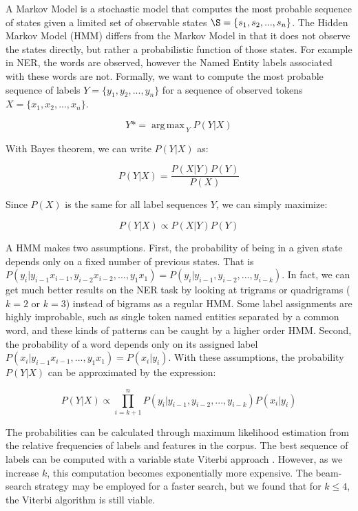 \documentclass[sigconf]{acmart}
\DeclareMathOperator*{\argmax}{arg\,max\,}
\begin{document}
A Markov Model is a stochastic model that computes the most probable sequence of states 
given a limited set of observable states $ \S = \{s_1, s_2, ..., s_n \} $.
The Hidden Markov Model (HMM) differs from the Markov Model in that it
does not observe the states directly, but rather a probabilistic function of those 
states. For example in NER, the words are observed, however the Named Entity labels
associated with these words are not. Formally, we want to compute the most probable
sequence of labels $ Y = \{y_1, y_2, ..., y_n\} $ for a sequence of observed tokens
$ X = \{x_1, x_2, ..., x_n\} $.

\begin{equation}
Y* = \argmax_{Y} P(Y|X)
\end{equation}

With Bayes theorem, we can write $ P(Y|X) $ as:

\begin{equation}
P(Y|X) = \frac{P(X|Y) P(Y)}{P(X)}
\end{equation}

Since $ P(X) $ is the same for all label sequences $ Y $, we can simply maximize:

\begin{equation}
P(Y|X) \propto P(X|Y) P(Y)
\end{equation}

A HMM makes two assumptions. First, the probability of being in a given state depends 
only on a fixed number of previous states. That is 
$ P(y_i|y_{i-1}x_{i-1}, y_{i-2}x_{i-2}, ..., y_1x_1) = P(y_i|y_{i-1}, y_{i-2},..., y_{i-k}) $. 
In fact, we can get much better results on the NER task by looking at trigrams
or quadrigrams ($ k = 2 $ or $ k = 3 $) instead of bigrams as a regular HMM. 
Some label assignments are highly improbable, such as single token named entities 
separated by a common word, and these kinds of patterns can be caught by a higher order HMM.
Second, the probability of a word depends only on its assigned label 
$ P(x_i|y_{i-1}x_{i-1}, ..., y_1x_1) = P(x_i|y_i) $. With these assumptions, 
the probability $ P(Y|X) $ can be approximated by the expression:

\begin{equation}
P(Y|X) \propto \prod_{i=k+1}^{n} P(y_i|y_{i-1}, y_{i-2}, ..., y_{i-k}) P(x_i|y_i)
\end{equation}

The probabilities can be calculated through maximum likelihood estimation from the relative
frequencies of labels and features in the corpus. The best sequence of labels can be computed 
with a variable state Viterbi approach \cite{Li2000}. However, as we increase $ k $, this computation 
becomes exponentially more expensive. The beam-search strategy may be employed for a faster 
search, but we found that for $ k \leq 4 $, the Viterbi algorithm is still viable.
\end{document}
